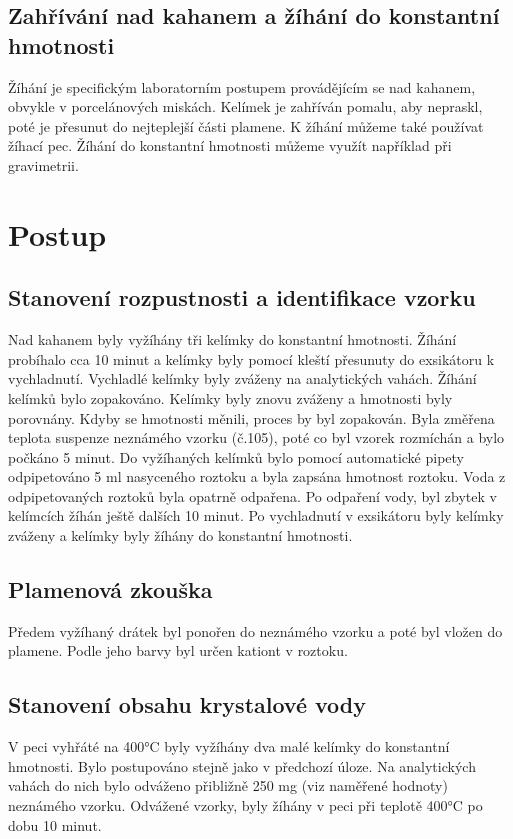 \documentclass[13pt, a4paper, twoside]{article}
\begin{document}
\subsection*{Zahřívání nad kahanem a žíhání do konstantní hmotnosti}
Žíhání je specifickým laboratorním postupem provádějícím se nad kahanem, obvykle v porcelánových miskách. Kelímek je zahříván pomalu, aby nepraskl, poté je přesunut do nejteplejší části plamene. K žíhání můžeme také používat žíhací pec.
Žíhání do konstantní hmotnosti můžeme využít například při gravimetrii. 

\section*{Postup}
\subsection*{Stanovení rozpustnosti a identifikace vzorku}
Nad kahanem byly vyžíhány tři kelímky do konstantní hmotnosti. Žíhání probíhalo cca 10 minut a kelímky byly pomocí kleští přesunuty do exsikátoru k vychladnutí. Vychladlé kelímky byly zváženy na analytických vahách. Žíhání kelímků bylo zopakováno. Kelímky byly znovu zváženy a hmotnosti byly porovnány. Kdyby se hmotnosti měnili, proces by byl zopakován. Byla změřena teplota suspenze neznámého vzorku (č.105), poté co byl vzorek rozmíchán a bylo počkáno 5 minut. Do vyžíhaných kelímků bylo pomocí automatické pipety odpipetováno 5 ml nasyceného roztoku a byla zapsána hmotnost roztoku. Voda z odpipetovaných roztoků byla opatrně odpařena. Po odpaření vody, byl zbytek v kelímcích žíhán ještě dalších 10 minut. Po vychladnutí v exsikátoru byly kelímky zváženy a kelímky byly žíhány do konstantní hmotnosti.

\subsection*{Plamenová zkouška}
Předem vyžíhaný drátek byl ponořen do neznámého vzorku a poté byl vložen do plamene. Podle jeho barvy byl určen kationt v roztoku.

\subsection*{Stanovení obsahu krystalové vody}
V peci vyhřáté na 400°C byly vyžíhány dva malé kelímky do konstantní hmotnosti. Bylo postupováno stejně jako v předchozí úloze. Na analytických vahách do nich bylo odváženo přibližně 250 mg (viz naměřené hodnoty) neznámého vzorku. Odvážené vzorky, byly žíhány v peci při teplotě 400°C po dobu 10 minut.
\end{document}
